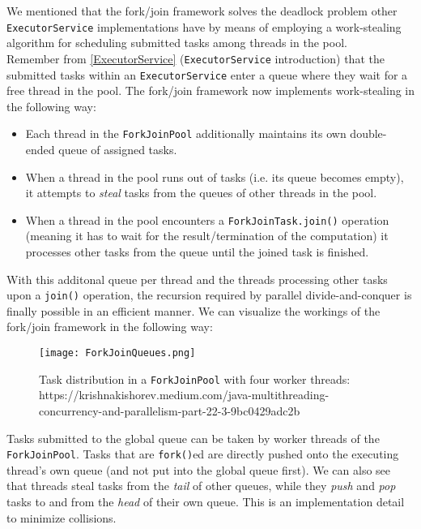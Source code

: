 \documentclass[main.tex]{subfiles}
\begin{document}
We mentioned that the fork/join framework solves the deadlock problem other \texttt{ExecutorService} implementations have by means of employing a work-stealing algorithm for scheduling submitted tasks among threads in the pool.\\[3mm]
Remember from \ref{ExecutorService} (\texttt{ExecutorService} introduction) that the submitted tasks within an \texttt{ExecutorService} enter a queue where they wait for a free thread in the pool. The fork/join framework now implements work-stealing in the following way:

\begin{itemize}
  \item Each thread in the \texttt{ForkJoinPool} additionally maintains its own double-ended queue of assigned tasks.
  \item When a thread in the pool runs out of tasks (i.e. its queue becomes empty), it attempts to \textit{steal} tasks from the queues of other threads in the pool.
  \item When a thread in the pool encounters a \texttt{ForkJoinTask.join()} operation (meaning it has to wait for the result/termination of the computation) it processes other tasks from the queue until the joined task is finished.
\end{itemize}

\noindent With this additonal queue per thread and the threads processing other tasks upon a \texttt{join()} operation, the recursion required by parallel divide-and-conquer is finally possible in an efficient manner. We can visualize the workings of the fork/join framework in the following way:


\begin{figure}[H]
    \centering
    \texttt{[image: ForkJoinQueues.png]}
    \caption{Task distribution in a \texttt{ForkJoinPool} with four worker threads: https://krishnakishorev.medium.com/java-multithreading-concurrency-and-parallelism-part-22-3-9bc0429adc2b}
\end{figure}

\noindent Tasks submitted to the global queue can be taken by worker threads of the \texttt{ForkJoinPool}. Tasks that are \texttt{fork()}ed are directly pushed onto the executing thread's own queue (and not put into the global queue first). We can also see that threads steal tasks from the \textit{tail} of other queues, while they \textit{push} and \textit{pop} tasks to and from the \textit{head} of their own queue. This is an implementation detail to minimize collisions.
\end{document}
